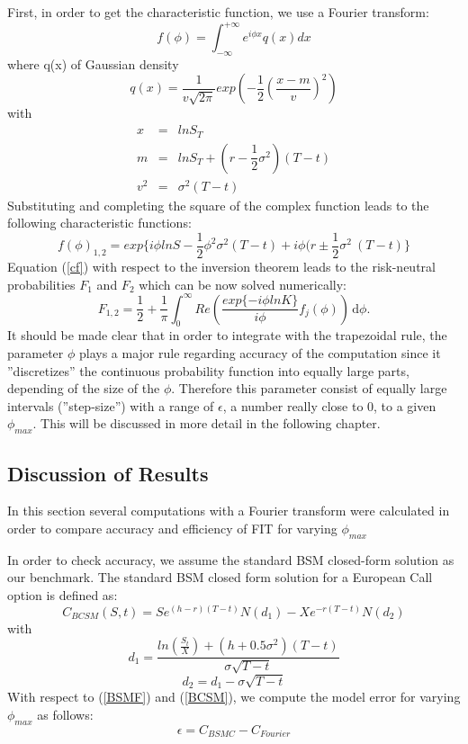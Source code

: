 \documentclass[a4paper,11pt]{article}
\begin{document}
First, in order to get the characteristic function, we use a Fourier transform:
\begin{equation*}
f(\phi)= \int_{-\infty}^{+\infty}e^{i\phi x} q(x)dx
\end{equation*}
where q(x) of Gaussian density
\begin{equation*}
q(x) = \dfrac{1}{v\sqrt{2\pi}} exp\left(-\dfrac{1}{2}(\dfrac{x-m}{v})^2\right)
\end{equation*}
with
\begin{eqnarray*}
x&=&ln S_T\\
m&=& ln S_T + (r - \dfrac{1}{2} \sigma^2)(T-t)\\
v^2&=&\sigma^2 (T-t)
\end{eqnarray*}
Substituting and completing the square of the complex function leads to the following characteristic functions:
\begin{equation}
f(\phi)_{1,2}=exp \{i\phi ln S - \dfrac{1}{2} \phi^2 \sigma^2 (T - t) + i \phi (r \pm \dfrac{1}{2} \sigma^2\ (T - t) \}
\label{cf}
\end{equation}
Equation (\ref{cf}) with respect to the inversion theorem leads to the risk-neutral probabilities $F_1$ and $F_2$ which can be now solved numerically:
\begin{equation}
F_{1,2}=\dfrac{1}{2}+\dfrac{1}{\pi}\int_0^{\infty} \! Re\left(\dfrac{exp\{-i\phi ln K\}}{i\phi} f_j(\phi) \right) \, \mathrm{d}\phi.
\label{CDF}
\end{equation}
It should be made clear that in order to integrate with the trapezoidal rule, the parameter $\phi$ plays a major rule regarding accuracy of the computation since it ''discretizes'' the continuous probability function into equally large parts, depending of the size of the $\phi$. Therefore this parameter consist of equally large intervals (''step-size'') with a range of $\epsilon$, a number really close to 0, to a given $\phi_{max}$. This will be discussed in more detail in the following chapter.
\subsection{Discussion of Results}
In this section several computations with a Fourier transform were calculated in order to compare accuracy and efficiency of FIT for varying $\phi_{max}$

In order to check accuracy, we assume the standard BSM closed-form solution as our benchmark. The standard BSM closed form solution for a European Call option is defined as:
\begin{equation}
C_{BCSM}(S,t)=S e^{(h-r)(T-t)}N(d_1)-Xe^{-r(T-t)}N(d_2)
\label{BCSM}
\end{equation}
with
\begin{equation*}
d_1=\frac{ln(\frac{S_t}{X})+(h+0.5\sigma^2)(T-t)}{\sigma \sqrt{T-t}}
\end{equation*}
\begin{equation*}
d_2=d_1-\sigma\sqrt{T-t}
\end{equation*}
With respect to (\ref{BSMF}) and (\ref{BCSM}), we compute the model error for varying $\phi_{max}$ as follows:
\begin{equation*}
\epsilon= C_{BSMC} - C_{Fourier}
\end{equation*}
\end{document}
